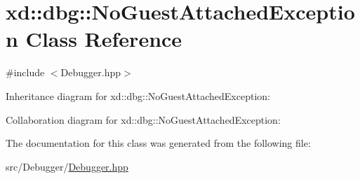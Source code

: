 \hypertarget{classxd_1_1dbg_1_1_no_guest_attached_exception}{}\section{xd\+:\+:dbg\+:\+:No\+Guest\+Attached\+Exception Class Reference}
\label{classxd_1_1dbg_1_1_no_guest_attached_exception}


{\ttfamily \#include $<$Debugger.\+hpp$>$}



Inheritance diagram for xd\+:\+:dbg\+:\+:No\+Guest\+Attached\+Exception\+:


Collaboration diagram for xd\+:\+:dbg\+:\+:No\+Guest\+Attached\+Exception\+:


The documentation for this class was generated from the following file\+:\begin{DoxyCompactItemize}
\item 
src/\+Debugger/\mbox{\hyperlink{_debugger_8hpp}{Debugger.\+hpp}}\end{DoxyCompactItemize}
